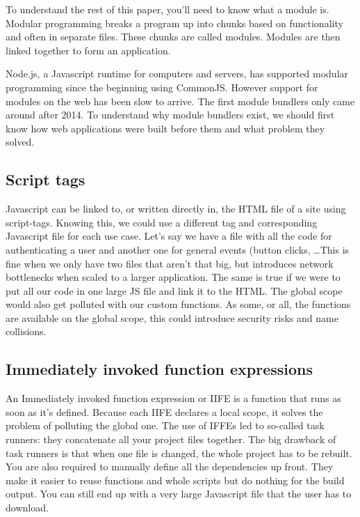 To understand the rest of this paper, you’ll need to know what a module is. Modular programming breaks a program up into chunks based on functionality and often in separate files. These chunks are called modules. Modules are then linked together to form an application. 

Node.js, a Javascript runtime for computers and servers, has supported modular programming since the beginning using CommonJS. However support for modules on the web has been slow to arrive. The first module bundlers only came around after 2014. To understand why module bundlers exist, we should first know how web applications were built before them and what problem they solved.

\subsection{Script tags}

Javascript can be linked to, or written directly in, the HTML file of a site using script-tags. Knowing this, we could use a different tag and corresponding Javascript file for each use case. Let’s say we have a file with all the code for authenticating a user and another one for general events (button clicks, \ldots This is fine when we only have two files that aren’t that big, but introduces network bottlenecks when scaled to a larger application. The same is true if we were to put all our code in one large JS file and link it to the HTML. The global scope would also get polluted with our custom functions. As some, or all, the functions are available on the global scope, this could introduce security risks and name collisions. 



\subsection{Immediately invoked function expressions}

An Immediately invoked function expression or IIFE is a function that runs as soon as it’s defined. Because each IIFE declares a local scope, it solves the problem of polluting the global one. The use of IFFEs led to so-called task runners: they concatenate all your project files together. The big drawback of task runners is that when one file is changed, the whole project has to be rebuilt. You are also required to manually define all the dependencies up front. They make it easier to reuse functions and whole scripts but do nothing for the build output. You can still end up with a very large Javascript file that the user has to download. 

